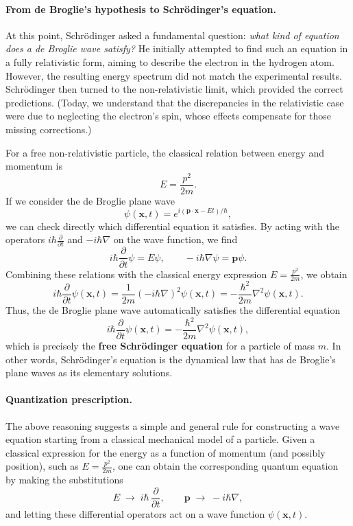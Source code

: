 \paragraph{From de Broglie’s hypothesis to Schrödinger’s equation.}
At this point, Schrödinger asked a fundamental question: \textit{what kind of equation does a de Broglie wave satisfy?}
He initially attempted to find such an equation in a fully relativistic form, aiming to describe the electron in the hydrogen atom. However, the resulting energy spectrum did not match the experimental results. Schrödinger then turned to the non-relativistic limit, which provided the correct predictions.
(Today, we understand that the discrepancies in the relativistic case were due to neglecting the electron’s spin, whose effects compensate for those missing corrections.)

For a free non-relativistic particle, the classical relation between energy and momentum is
\[
    E = \frac{p^2}{2m}.
\]
If we consider the de Broglie plane wave
\[
    \psi(\mathbf{x},t) = e^{i(\mathbf{p}\cdot\mathbf{x} - Et)/\hbar},
\]
we can check directly which differential equation it satisfies.
By acting with the operators \( i\hbar \frac{\partial}{\partial t} \) and \( -i\hbar\nabla \) on the wave function, we find
\[
    i\hbar \frac{\partial}{\partial t} \psi = E \psi,
    \qquad
    -i\hbar\nabla \psi = \mathbf{p} \psi.
\]
Combining these relations with the classical energy expression \( E = \frac{p^2}{2m} \), we obtain
\[
    i\hbar \frac{\partial}{\partial t} \psi(\mathbf{x},t)
    = \frac{1}{2m}(-i\hbar\nabla)^2 \psi(\mathbf{x},t)
    = -\frac{\hbar^2}{2m} \nabla^2 \psi(\mathbf{x},t).
\]
Thus, the de Broglie plane wave automatically satisfies the differential equation
\begin{equation}
    i\hbar \frac{\partial}{\partial t} \psi(\mathbf{x},t)
    = -\frac{\hbar^2}{2m} \nabla^2 \psi(\mathbf{x},t),
    \label{eq:free_Schrödinger_nonrel}
\end{equation}
which is precisely the \textbf{free Schrödinger equation} for a particle of mass \(m\).
In other words, Schrödinger’s equation is the dynamical law that has de Broglie’s plane waves as its elementary solutions.

\paragraph{Quantization prescription.}
The above reasoning suggests a simple and general rule for constructing a wave equation starting from a classical mechanical model of a particle.
Given a classical expression for the energy as a function of momentum (and possibly position), such as \(E = \frac{p^2}{2m}\), one can obtain the corresponding quantum equation by making the substitutions
\[
    E \;\longrightarrow\; i\hbar\,\frac{\partial}{\partial t},
    \qquad
    \mathbf{p} \;\longrightarrow\; -i\hbar\nabla,
\]
and letting these differential operators act on a wave function \(\psi(\mathbf{x},t)\).

